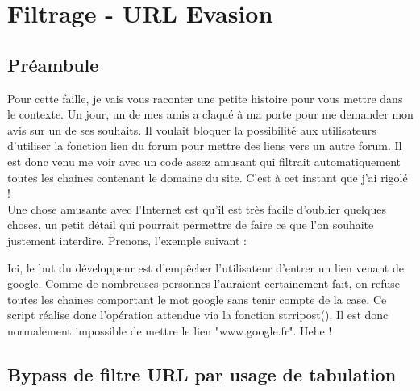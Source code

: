 \documentclass{article}
\begin{document}
\newpage
\section{Filtrage - URL Evasion}
\subsection{Préambule}
Pour cette faille, je vais vous raconter une petite histoire pour vous mettre dans le contexte. Un jour, un de mes amis a claqué à ma porte pour me demander mon avis sur un de ses souhaits. Il voulait bloquer la possibilité aux utilisateurs d'utiliser la fonction lien du forum pour mettre des liens vers un autre forum. Il est donc venu me voir avec un code assez amusant qui filtrait automatiquement toutes les chaines contenant le domaine du site. C'est à cet instant que j'ai rigolé !\\ 
Une chose amusante avec l'Internet est qu'il est très facile d'oublier quelques choses, un petit détail qui pourrait permettre de faire ce que l'on souhaite justement interdire. Prenons, l'exemple suivant :
\vspace{0.2cm}\\
\vspace{0.2cm}

Ici, le but du développeur est d'empêcher l'utilisateur d'entrer un lien venant de google. Comme de nombreuses personnes l'auraient certainement fait, on refuse toutes les chaines comportant le mot google sans tenir compte de la case. Ce script réalise donc l'opération attendue via la fonction strripost(). Il est donc normalement impossible de mettre le lien "www.google.fr". Hehe !

\subsection{Bypass de filtre URL par usage de tabulation}
\end{document}
